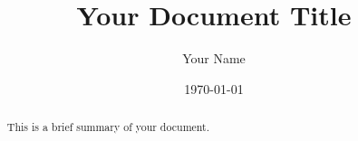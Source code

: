 \documentclass[a4paper,12pt]{article}
\title{Your Document Title}
\author{Your Name}
\date{\today}
\begin{document}
\maketitle

\begin{abstract}
This is a brief summary of your document.
\end{abstract}

\tableofcontents


  


\end{document}
